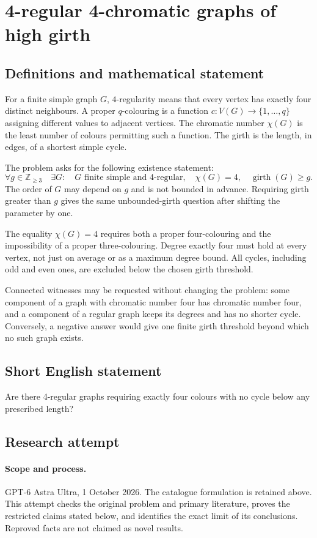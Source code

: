 \documentclass[11pt,a4paper]{article}
\begin{document}
\section*{4-regular 4-chromatic graphs of high girth}\label{statement}

\subsection{Definitions and mathematical statement}
For a finite simple graph $G$, $4$-regularity means
that every vertex has exactly four distinct neighbours.
A proper $q$-colouring is a function
$c:V(G)\to\{1,\ldots,q\}$ assigning different values
to adjacent vertices. The chromatic number $\chi(G)$
is the least number of colours permitting such a
function. The girth is the length, in edges, of a
shortest simple cycle.

The problem asks for the following existence statement:
\[
 \forall g\in\mathbb Z_{\geq3}\quad\exists G:
 \quad G\text{ finite simple and $4$-regular},\quad
 \chi(G)=4,\quad\operatorname{girth}(G)\geq g.
\]
The order of $G$ may depend on $g$ and is not bounded
in advance. Requiring girth greater than $g$ gives
the same unbounded-girth question after shifting
the parameter by one.

The equality $\chi(G)=4$ requires both a proper
four-colouring and the impossibility of a proper
three-colouring. Degree exactly four must hold at
every vertex, not just on average or as a maximum
degree bound. All cycles, including odd and even
ones, are excluded below the chosen girth threshold.

Connected witnesses may be requested without changing
the problem: some component of a graph with chromatic
number four has chromatic number four, and a component
of a regular graph keeps its degrees and has no
shorter cycle. Conversely, a negative answer would
give one finite girth threshold beyond which no
such graph exists.
\subsection{Short English statement}
Are there 4-regular graphs requiring exactly four colours with no cycle below any prescribed length?
\subsection{Research attempt}
\paragraph{Scope and process.}
GPT-6 Astra Ultra, 1 October 2026. The catalogue formulation is retained above. This attempt checks the original problem and primary literature, proves the restricted claims stated below, and identifies the exact limit of its conclusions. Reproved facts are not claimed as novel results.
\end{document}
